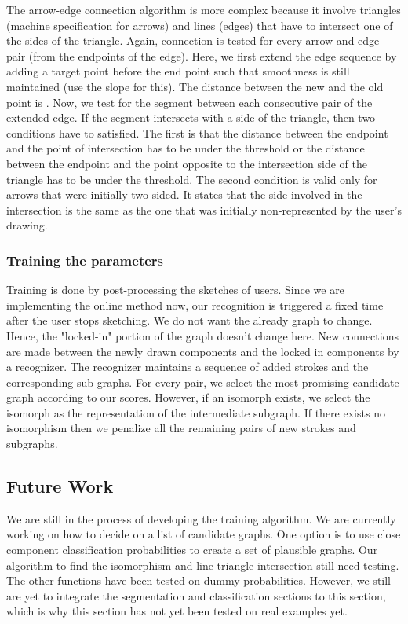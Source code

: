 The arrow-edge connection algorithm is more complex because it involve triangles (machine specification for arrows) and lines (edges) that have to intersect one of the sides of the triangle. Again, connection is tested for every arrow and edge pair (from the endpoints of the edge). Here, we first extend the edge sequence by adding a target point before the end point such that smoothness is still maintained (use the slope for this). The distance between the new and the old point is \gamma . Now, we test for the segment between each consecutive pair of the extended edge. If the segment intersects with a side of the triangle, then two conditions have to satisfied. The first is that the distance between the endpoint and the point of intersection has to be under the threshold or the distance between the endpoint and the point opposite to the intersection side of the triangle has to be under the threshold. The second condition is valid only for arrows that were initially two-sided. It states that the side involved in the intersection is the same as the one that was initially non-represented by the user's drawing.\\

\subsubsection{Training the parameters}

Training is done by post-processing the sketches of users. Since we are implementing the online method now, our recognition is triggered a fixed time after the user stops sketching. We do not want the already graph to change. Hence, the "locked-in" portion of the graph doesn't change here. New connections are made between the newly drawn components and the locked in components by a recognizer. The recognizer maintains a sequence of added strokes and the corresponding sub-graphs. For every pair, we select the most promising candidate graph according to our scores. However, if an isomorph exists, we select the isomorph as the representation of the intermediate subgraph. If there exists no isomorphism then we penalize all the remaining pairs of new strokes and subgraphs.\\

\subsection{Future Work}

We are still in the process of developing the training algorithm. We are currently working on how to decide on a list of candidate graphs. One option is to use close component classification probabilities to create a set of plausible graphs. Our algorithm to find the isomorphism and line-triangle intersection still need testing. The other functions have been tested on dummy probabilities. However, we still are yet to integrate the segmentation and classification sections to this section, which is why this section has not yet been tested on real examples yet.\\

